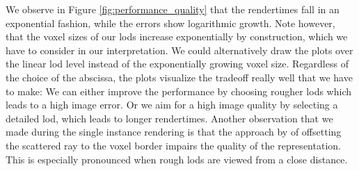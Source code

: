 We observe in Figure \ref{fig:performance_quality} that the rendertimes fall in an exponential fashion, while the \FLIP errors show logarithmic growth.
Note however, that the voxel sizes of our \acsp{lod} increase exponentially by construction, which we have to consider in our interpretation.
We could alternatively draw the plots over the linear \ac{lod} level instead of the exponentially growing voxel size.
Regardless of the choice of the abscissa, the plots visualize the tradeoff really well that we have to make: We can either improve the performance by choosing rougher \acsp{lod} which leads to a high image error.
Or we aim for a high image quality by selecting a detailed \ac{lod}, which leads to longer rendertimes.
Another observation that we made during the single instance rendering is that the approach by \citeauthor{vicini2021non} of offsetting the scattered ray to the voxel border impairs the quality of the representation.
This is especially pronounced when rough \acsp{lod} are viewed from a close distance.






